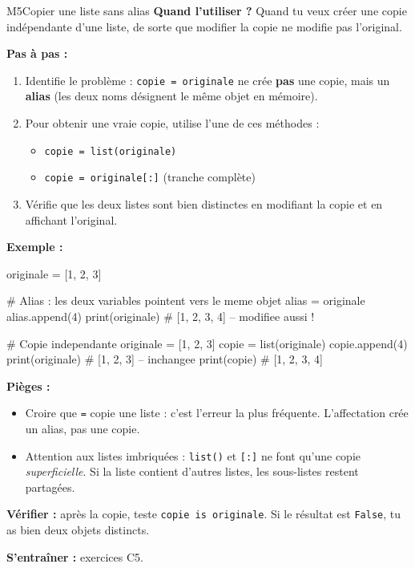 \begin{fichemethode}{M5}{Copier une liste sans alias}
\textbf{Quand l'utiliser ?} Quand tu veux créer une copie indépendante d'une liste, de sorte que modifier la copie ne modifie pas l'original.

\textbf{Pas à pas :}
\begin{enumerate}
  \item Identifie le problème : \lstinline{copie = originale} ne crée \textbf{pas} une copie, mais un \textbf{alias} (les deux noms désignent le même objet en mémoire).
  \item Pour obtenir une vraie copie, utilise l'une de ces méthodes :
    \begin{itemize}
      \item \lstinline{copie = list(originale)}
      \item \lstinline{copie = originale[:]} (tranche complète)
    \end{itemize}
  \item Vérifie que les deux listes sont bien distinctes en modifiant la copie et en affichant l'original.
\end{enumerate}

\textbf{Exemple :}
\begin{python}
originale = [1, 2, 3]

# Alias : les deux variables pointent vers le meme objet
alias = originale
alias.append(4)
print(originale)  # [1, 2, 3, 4] -- modifiee aussi !

# Copie independante
originale = [1, 2, 3]
copie = list(originale)
copie.append(4)
print(originale)  # [1, 2, 3] -- inchangee
print(copie)      # [1, 2, 3, 4]
\end{python}

\textbf{Pièges :}
\begin{itemize}
  \item Croire que \lstinline{=} copie une liste : c'est l'erreur la plus fréquente. L'affectation crée un alias, pas une copie.
  \item Attention aux listes imbriquées : \lstinline{list()} et \lstinline{[:]} ne font qu'une copie \emph{superficielle}. Si la liste contient d'autres listes, les sous-listes restent partagées.
\end{itemize}

\textbf{Vérifier :} après la copie, teste \lstinline{copie is originale}. Si le résultat est \lstinline{False}, tu as bien deux objets distincts.

\textbf{S'entraîner :} exercices C5.
\end{fichemethode}
